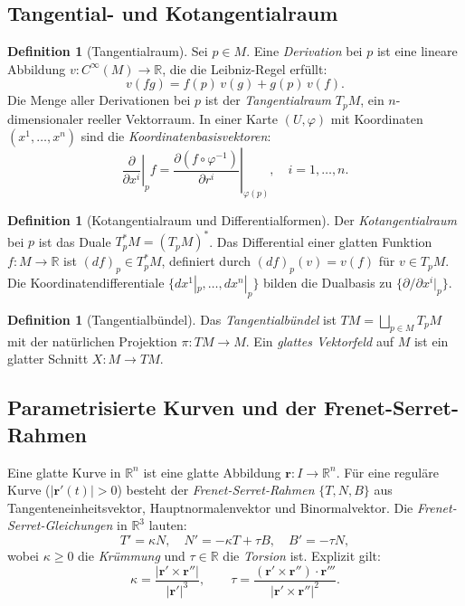 \documentclass[12pt,a4paper]{amsart}
\theoremstyle{definition}
\newtheorem{definition}[theorem]{Definition}
\begin{document}
\subsection{Tangential- und Kotangentialraum}

\begin{definition}[Tangentialraum]
Sei $p \in M$. Eine \emph{Derivation} bei $p$ ist eine lineare Abbildung
$v: C^\infty(M) \to \mathbb{R}$, die die Leibniz-Regel erfüllt:
\[
  v(fg) = f(p)\,v(g) + g(p)\,v(f).
\]
Die Menge aller Derivationen bei $p$ ist der \emph{Tangentialraum} $T_pM$,
ein $n$-dimensionaler reeller Vektorraum. In einer Karte $(U, \varphi)$ mit
Koordinaten $(x^1, \ldots, x^n)$ sind die \emph{Koordinatenbasisvektoren}:
\[
  \left.\frac{\partial}{\partial x^i}\right|_p f
  = \left.\frac{\partial (f \circ \varphi^{-1})}{\partial r^i}\right|_{\varphi(p)},
  \quad i = 1, \ldots, n.
\]
\end{definition}

\begin{definition}[Kotangentialraum und Differentialformen]
Der \emph{Kotangentialraum} bei $p$ ist das Duale $T_p^*M = (T_pM)^*$.
Das Differential einer glatten Funktion $f: M \to \mathbb{R}$ ist
$(df)_p \in T_p^*M$, definiert durch $(df)_p(v) = v(f)$ für $v \in T_pM$.
Die Koordinatendifferentiale $\{dx^1|_p, \ldots, dx^n|_p\}$ bilden die
Dualbasis zu $\{\partial/\partial x^i|_p\}$.
\end{definition}

\begin{definition}[Tangentialbündel]
Das \emph{Tangentialbündel} ist $TM = \bigsqcup_{p \in M} T_pM$ mit der
natürlichen Projektion $\pi: TM \to M$. Ein \emph{glattes Vektorfeld}
auf $M$ ist ein glatter Schnitt $X: M \to TM$.
\end{definition}

\subsection{Parametrisierte Kurven und der Frenet-Serret-Rahmen}

Eine glatte Kurve in $\mathbb{R}^n$ ist eine glatte Abbildung
$\mathbf{r}: I \to \mathbb{R}^n$. Für eine reguläre Kurve ($|\mathbf{r}'(t)| > 0$)
besteht der \emph{Frenet-Serret-Rahmen} $\{T, N, B\}$ aus Tangenteneinheitsvektor,
Hauptnormalenvektor und Binormalvektor. Die \emph{Frenet-Serret-Gleichungen}
in $\mathbb{R}^3$ lauten:
\[
  T' = \kappa N, \quad N' = -\kappa T + \tau B, \quad B' = -\tau N,
\]
wobei $\kappa \geq 0$ die \emph{Krümmung} und $\tau \in \mathbb{R}$ die
\emph{Torsion} ist. Explizit gilt:
\[
  \kappa = \frac{|\mathbf{r}' \times \mathbf{r}''|}{|\mathbf{r}'|^3},
  \qquad
  \tau = \frac{(\mathbf{r}' \times \mathbf{r}'') \cdot \mathbf{r}'''}{|\mathbf{r}' \times \mathbf{r}''|^2}.
\]
\end{document}
